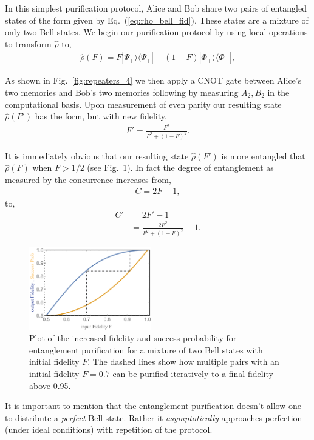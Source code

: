 \documentclass[twocolumn, aps, rmp, amsmath, amssymb, nofootinbib, superscriptaddress, longbibliography, floatfix, table-of-contents, eqsecnum]{revtex4-1}
\begin{document}
In this simplest purification protocol, Alice and Bob share two pairs of entangled states of the form given by Eq.~(\ref{eq:rho_bell_fid}). These states are a mixture of only two Bell states. We begin our purification protocol by using local operations to transform $\hat\rho$ to,
\begin{align}\label{eq:rho_bell_fid_dash}
\hat\rho(F)=F |\Psi_+\rangle \langle \Psi_+|+(1-F) |\Phi_+\rangle \langle \Phi_+|,
\end{align}

As shown in Fig.~\ref{fig:repeaters_4} we then apply a CNOT gate between Alice's two memories and Bob's two memories following by measuring $A_2,B_2$ in the computational basis. Upon measurement of even parity our resulting state $\hat\rho(F')$ has the form, but with new fidelity,
\begin{align}
	F'=\frac{F^2}{F^2+(1-F)^2}.
\end{align}

It is immediately obvious that our resulting state $\hat\rho(F')$ is more entangled that $\hat\rho(F)$ when \mbox{$F>1/2$} (see Fig.~\ref{fig:rep_purification}). In fact the degree of entanglement as measured by the concurrence increases from,
\begin{align}
	C=2 F-1,
\end{align}
to,
\begin{align}
C' &=2 F'-1 \nonumber\\
&= \frac{2 F^2}{F^2+(1-F)^2}-1.
\end{align}

\begin{figure}[!htb]
\includegraphics[width=0.475\textwidth]{repeaters_5}
\caption{Plot of the increased fidelity and success probability for entanglement purification for a mixture of two Bell states with initial fidelity $F$. The dashed lines show how multiple pairs with an initial fidelity $F=0.7$ can be purified iteratively to a final fidelity above 0.95.} 
\label{fig:rep_purification}
\end{figure} 

It is important to mention that the entanglement purification doesn't allow one to distribute a \textit{perfect} Bell state. Rather it \textit{asymptotically} approaches perfection (under ideal conditions) with repetition of the protocol.
\end{document}
